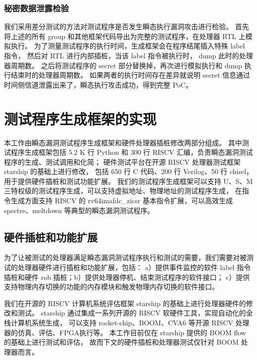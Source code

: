 \subsubsection{秘密数据泄露检验}

我们采用差分测试的方法对测试程序是否发生瞬态执行漏洞攻击进行检验。
首先将上述的所有 group 和其他框架代码导出为完整的测试程序，在处理器 RTL 上模拟执行。
为了测量测试程序的执行时间，生成框架会在程序结尾插入特殊 label 指令，
然后对 RTL 进行内部插桩，当该 label 指令被执行时， dump 此时的处理器周期数。
之后将测试程序的 secret 部分替换掉，再次进行模拟执行和 dump 执行结束时的处理器周期数。
如果两者的执行时间存在差异就说明 secret 信息通过时间侧信道泄露出来了，瞬态执行攻击成功，得到完整 PoC。

\cleardoublepage
\section{测试程序生成框架的实现}

本工作由瞬态漏洞测试程序生成框架和硬件处理器插桩修改两部分组成。
其中测试程序生成框架包括 5.2 K 行 Python 和 300 行 RISCV 汇编，负责瞬态漏洞测试程序的生成、测试调用和化简；
硬件测试平台在开源 RISCV 处理器测试框架 starship\cite{starship} 的基础上进行修改，
包括 650 行 C 代码、200 行 Verilog、50 行 chisel，用于提供硬件插桩和测试功能扩展。
我们的测试程序生成框架可以支持 U、S、M 三特权级的测试程序生成，可以支持虚拟地址、物理地址的测试程序生成，
在指令生成方面支持 RISCV 的 rv64imafdc\_zicsr 基本指令扩展，可以高效生成 spectre、meltdown 等典型的瞬态漏洞测试程序。\par

\subsection{硬件插桩和功能扩展}

为了让被测试的处理器满足瞬态漏洞测试程序执行和测试的需要，我们需要对被测试的处理器硬件进行插桩和功能扩展，包括：
a）提供事件监控的软件 label 指令插桩和硬件 rob 插桩；b）提供处理器停机、结束测试程序的软件接口；
c）提供支持物理内存切换的功能的内存模块和触发物理内存切换的软件接口。\par

我们在开源的 RISCV 计算机系统评估框架 starship\cite{starship} 的基础上进行处理器硬件的修改和测试。
starship 通过集成一系列开源的 RISCV 软硬件工具，实现自动化的全栈计算机系统生成，
可以支持 rocket-chip\cite{rocket-chip}、BOOM\cite{celio2017boomv2}、CVA6\cite{cva6} 等开源 RISCV 处理器的仿真、评估、FPGA执行等。
本工作目前仅在 starship 提供的 BOOM flow 的基础上进行测试和评估，
故而下文的硬件插桩和处理器测试仅针对 BOOM 处理器而言。\par

